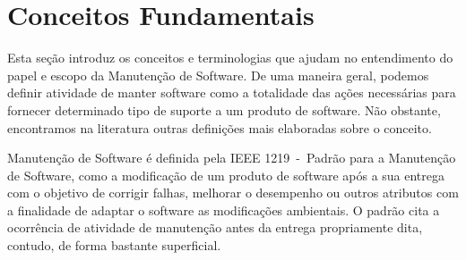 %
%
%
%
\section{Conceitos Fundamentais}
\label{sec:conceitos_basicos}
Esta seção introduz os conceitos e terminologias que ajudam no entendimento do
papel e escopo da Manutenção de Software. De uma maneira geral, podemos definir
atividade de manter software como a totalidade das ações necessárias para
fornecer determinado tipo de suporte a um produto de software.  Não obstante,
encontramos na literatura outras definições mais elaboradas sobre o conceito.

Manutenção de Software é definida pela IEEE 1219~\cite{720567}-~Padrão para a
Manutenção de Software, como a modificação de um produto de software após a sua
entrega com o objetivo de corrigir falhas, melhorar o desempenho ou outros
atributos com a finalidade de adaptar o software as modificações ambientais. O
padrão cita a ocorrência de atividade de manutenção antes da entrega
propriamente dita, contudo, de forma bastante superficial.

